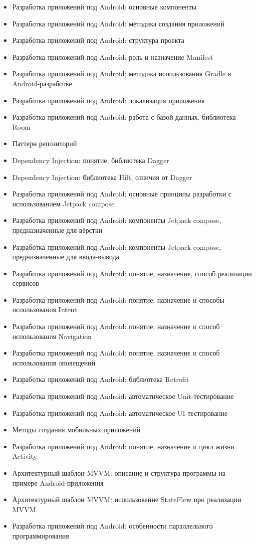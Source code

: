 \documentclass[a4paper,12pt]{article}
\begin{document}
\begin{itemize}
    \item Разработка приложений под Android: основные компоненты
    \item Разработка приложений под Android: методика создания приложений
    \item Разработка приложений под Android: структура проекта
    \item Разработка приложений под Android: роль и назначение Manifest
    \item Разработка приложений под Android: методика использования Gradle в Android-разработке
    \item Разработка приложений под Android: локализация приложения
    \item Разработка приложений под Android: работа с базой данных, библиотека Room
    \item Паттерн репозиторий
    \item Dependency Injection: понятие, библиотека Dagger
    \item Dependency Injection: библиотека Hilt, отличия от Dagger
    \item Разработка приложений под Android: основные принципы разработки с использованием Jetpack compose
    \item Разработка приложений под Android: компоненты Jetpack compose, предназначенные для вёрстки
    \item Разработка приложений под Android: компоненты Jetpack compose, предназначенные для ввода-вывода
    \item Разработка приложений под Android: понятие, назначение, способ реализации сервисов
    \item Разработка приложений под Android: понятие, назначение и способы использования Intent
    \item Разработка приложений под Android: понятие, назначение и способ использования Navigation
    \item Разработка приложений под Android: понятие, назначение и способ использования оповещений
    \item Разработка приложений под Android: библиотека Retrofit
    \item Разработка приложений под Android: автоматическое Unit-тестирование
    \item Разработка приложений под Android: автоматическое UI-тестирование
    \item Методы создания мобильных приложений
    \item Разработка приложений под Android: понятие, назначение и цикл жизни Activity
    \item Архитектурный шаблон MVVM: описание и структура программы на примере Android-приложения
    \item Архитектурный шаблон MVVM: использование StateFlow при реализации MVVM
    \item Разработка приложений под Android: особенности параллельного программирования
\end{itemize}
\end{document}

